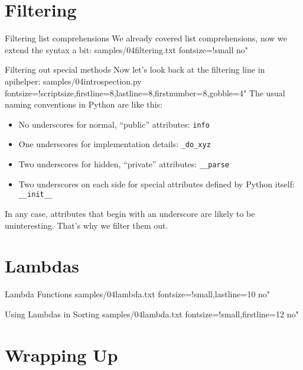 \documentclass{pyslides}
\begin{document}
\section{Filtering}

\begin{frame}[fragile]{Filtering list comprehensions}
We already covered list comprehensions, now we extend the syntax a bit:
 samples/04filtering.txt fontsize=!small no"
\end{frame}

\begin{frame}[fragile]{Filtering out special methods}
Now let's look back at the filtering line in apihelper:
 samples/04introspection.py fontsize=!scriptsize,firstline=8,lastline=8,firstnumber=8,gobble=4"
\bigskip
The usual naming conventions in Python are like this:
\begin{itemize}
\item No underscores for normal, “public” attributes: \verb+info+
\item One underscores for implementation details: \verb+_do_xyz+
\item Two underscores for hidden, “private” attributes: \verb+__parse+
\item Two underscores on each side for special attributes defined by Python itself: \verb+__init__+
\end{itemize}
In any case, attributes that begin with an underscore are likely to be uninteresting. That's why we filter them out.
\end{frame}

\section{Lambdas}

\begin{frame}[fragile]{Lambda Functions}
 samples/04lambda.txt fontsize=!small,lastline=10 no"
\end{frame}

\begin{frame}[fragile]{Using Lambdas in Sorting}
 samples/04lambda.txt fontsize=!small,firstline=12 no"
\end{frame}

\section{Wrapping Up}
\end{document}
